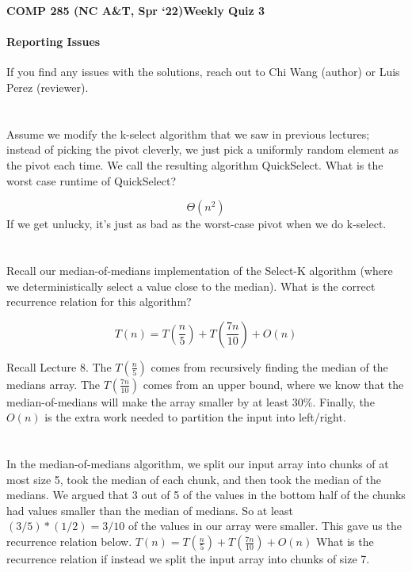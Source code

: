 \documentclass [12pt]{article}
\begin{document}
 

{\LARGE \textbf {COMP 285 (NC A\&T, Spr `22)}\hfill \textbf {Weekly Quiz 3} } 


\begin{Instruction}

\paragraph{Reporting Issues} If you find any issues with the solutions, reach out to Chi Wang (author) or Luis Perez (reviewer).

\end{Instruction}

\section{} Assume we modify the k-select algorithm that we saw in previous lectures; instead of picking the pivot cleverly, we just pick a uniformly random element as the pivot each time. We call the resulting algorithm QuickSelect. What is the worst case runtime of QuickSelect?

\begin{Solution}
$$\Theta(n^2)$$
If we get unlucky, it’s just as bad as the worst-case pivot when we do k-select.
\end{Solution}


\section{} Recall our median-of-medians implementation of the Select-K algorithm (where we deterministically select a value close to the median). What is the correct recurrence relation for this algorithm?

\begin{Solution}
$$T(n) = T\left(\frac{n}{5}\right) + T\left(\frac{7n}{10}\right) + O(n)$$

Recall Lecture 8. The $T\left(\frac{n}{5}\right)$ comes from recursively finding the median of the medians array. The $T\left(\frac{7n}{10}\right)$ comes from an upper bound, where we know that the median-of-medians will make the array smaller by at least $30\%$. Finally, the $O(n)$ is the extra work needed to partition the input into left/right.
\end{Solution}


\section{} In the median-of-medians algorithm, we split our input array into chunks of at most size 5, took the median of each chunk, and then took the median of the medians. We argued that 3 out of 5 of the values in the bottom half of the chunks had values smaller than the median of medians. So at least $(3/5)*(1/2) = 3/10$ of the values in our array were smaller. This gave us the recurrence relation below. $T(n) = T\left(\frac{n}{5}\right) + T\left(\frac{7n}{10}\right) + O(n)$
What is the recurrence relation if instead we split the input array into chunks of size 7.
\end{document}
